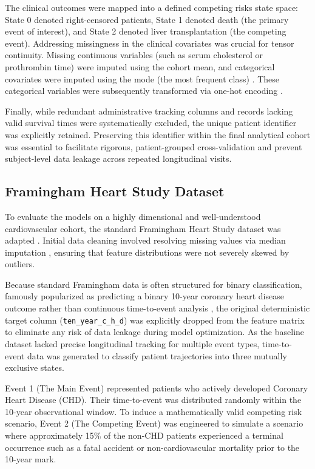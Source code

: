 \documentclass[a4paper,twoside,12pt]{report}
\begin{document}
The clinical outcomes were mapped into a defined competing risks state space: State 0 denoted right-censored patients, State 1 denoted death (the primary event of interest), and State 2 denoted liver transplantation (the competing event). Addressing missingness in the clinical covariates was crucial for tensor continuity. Missing continuous variables (such as serum cholesterol or prothrombin time) were imputed using the cohort mean, and categorical covariates were imputed using the mode (the most frequent class) \citep{little2019statistical}. These categorical variables were subsequently transformed via one-hot encoding \citep{bishop2006, kuhn2013applied}. 

Finally, while redundant administrative tracking columns and records lacking valid survival times were systematically excluded, the unique patient identifier was explicitly retained. Preserving this identifier within the final analytical cohort was essential to facilitate rigorous, patient-grouped cross-validation and prevent subject-level data leakage across repeated longitudinal visits.

\subsection{Framingham Heart Study Dataset}
To evaluate the models on a highly dimensional and well-understood cardiovascular cohort, the standard Framingham Heart Study dataset was adapted \citep{InterpretableFineGray2025}. Initial data cleaning involved resolving missing values via median imputation \cite{little2019statistical}, ensuring that feature distributions were not severely skewed by outliers. 

Because standard Framingham data is often structured for binary classification, famously popularized as predicting a binary 10-year coronary heart disease outcome rather than continuous time-to-event analysis \cite{wilson1998prediction}, the original deterministic target column (\texttt{ten\_year\_c\_h\_d}) was explicitly dropped from the feature matrix to eliminate any risk of data leakage during model optimization. As the baseline dataset lacked precise longitudinal tracking for multiple event types, time-to-event data was  generated to classify patient trajectories into three mutually exclusive states.

Event 1 (The Main Event) represented patients who actively developed Coronary Heart Disease (CHD). Their time-to-event was distributed randomly within the 10-year observational window. To induce a mathematically valid competing risk scenario, Event 2 (The Competing Event) was engineered to simulate a scenario where approximately 15\% of the non-CHD patients experienced a terminal occurrence such as a fatal accident or non-cardiovascular mortality prior to the 10-year mark. 
\end{document}
